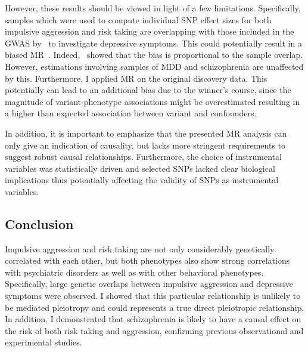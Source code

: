 However, these results should be viewed in light of a few limitations.
Specifically, samples which were used to compute individual SNP effect sizes for both impulsive aggression and risk taking are overlapping with those included in the GWAS by~\cite{Okbay2016} to investigate depressive symptoms.
This could potentially result in a biased MR~\cite{Burgess2016c}.
Indeed,~\citet{Burgess2016c} showed that the bias is proportional to the sample overlap. 
However, estimations involving samples of MDD and schizophrenia are unaffected by this.
Furthermore, I applied MR on the original discovery data.
This potentially can lead to an additional bias due to the winner's course, since the magnitude of variant-phenotype associations might be overestimated resulting in a higher than expected association between variant and confounders.

In addition, it is important to emphasize that the  presented MR analysis can only give an indication of causality, but lacks more stringent requirements to suggest robust causal relationships.
Furthermore, the choice of instrumental variables was statistically driven and selected SNPs lacked  clear biological implications thus potentially affecting the validity of SNPs as instrumental variables.

\subsection{Conclusion}
\label{sub:conclusion_psych}

Impulsive aggression and risk taking are not only considerably genetically correlated with  each other, but both phenotypes also show strong correlations with psychiatric disorders as well as with other behavioral phenotypes.
Specifically, large genetic overlaps between impulsive aggression and depressive symptoms were observed.
I showed that this particular relationship is unlikely to be mediated pleiotropy and could represents a true direct pleiotropic relationship.
In addition, I demonstrated that schizophrenia is likely to have a causal effect on the risk of both risk taking and aggression,
confirming previous observational and experimental studies.

